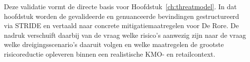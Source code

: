 Deze validatie vormt de directe basis voor Hoofdstuk~\ref{ch:threatmodel}. In dat hoofdstuk worden de gevalideerde en genuanceerde bevindingen gestructureerd via STRIDE en vertaald naar concrete mitigatiemaatregelen voor De Rore. De nadruk verschuift daarbij van de vraag welke risico's aanwezig zijn naar de vraag welke dreigingsscenario's daaruit volgen en welke maatregelen de grootste risicoreductie opleveren binnen een realistische KMO- en retailcontext.
